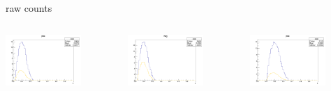 \begin{frame}{raw counts}
\begin{columns}
\begin{column}[T]{0.25\textwidth}
\includegraphics[width = 0.7\textwidth]{results/yield/statistics/yield_x_Q2_z_0.55_4.764_0.40_pos.png}
\end{column}
\begin{column}[T]{0.25\textwidth}
\includegraphics[width = 0.7\textwidth]{results/yield/statistics/yield_x_Q2_z_0.55_4.764_0.40_neg.png}
\end{column}
\begin{column}[T]{0.25\textwidth}
\includegraphics[width = 0.7\textwidth]{results/yield/statistics/yield_x_Q2_z_0.55_4.764_0.50_pos.png}

\end{column}
\end{columns}
\end{frame}
